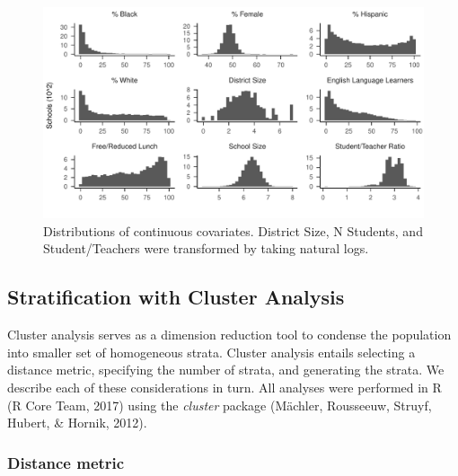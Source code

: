 \documentclass[english,man,floatsintext]{apa6}
\begin{document}
\begin{figure}
\centering
\includegraphics{6---Paper_files/figure-latex/fig-dist1-1.pdf}
\caption{\label{fig:fig-dist1}Distributions of continuous covariates. District Size, N Students, and Student/Teachers were transformed by taking natural logs.}
\end{figure}

\hypertarget{stratification-with-cluster-analysis}{%
\subsection{Stratification with Cluster Analysis}\label{stratification-with-cluster-analysis}}

Cluster analysis serves as a dimension reduction tool to condense the population into smaller set of homogeneous strata. Cluster analysis entails selecting a distance metric, specifying the number of strata, and generating the strata. We describe each of these considerations in turn. All analyses were performed in R (R Core Team, 2017) using the \emph{cluster} package (Mächler, Rousseeuw, Struyf, Hubert, \& Hornik, 2012).

\hypertarget{distance-metric}{%
\subsubsection{Distance metric}\label{distance-metric}}
\end{document}
